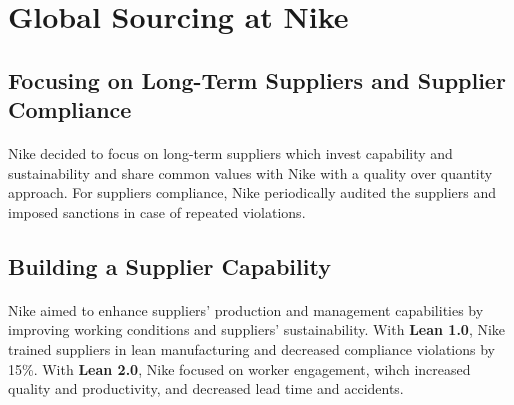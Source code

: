 \section{Global Sourcing at Nike}

\subsection{Focusing on Long-Term Suppliers and Supplier Compliance}

\paragraph{} Nike decided to focus on long-term suppliers which invest capability and sustainability and share common values with Nike with a quality over quantity approach. For suppliers compliance, Nike periodically audited the suppliers and imposed sanctions in case of repeated violations.

\subsection{Building a Supplier Capability}

\paragraph{} Nike aimed to enhance suppliers' production and management capabilities by improving working conditions and suppliers' sustainability. With \textbf{Lean 1.0}, Nike trained suppliers in lean manufacturing and decreased compliance violations by 15\%. With \textbf{Lean 2.0}, Nike focused on worker engagement, wihch increased quality and productivity, and decreased lead time and accidents.